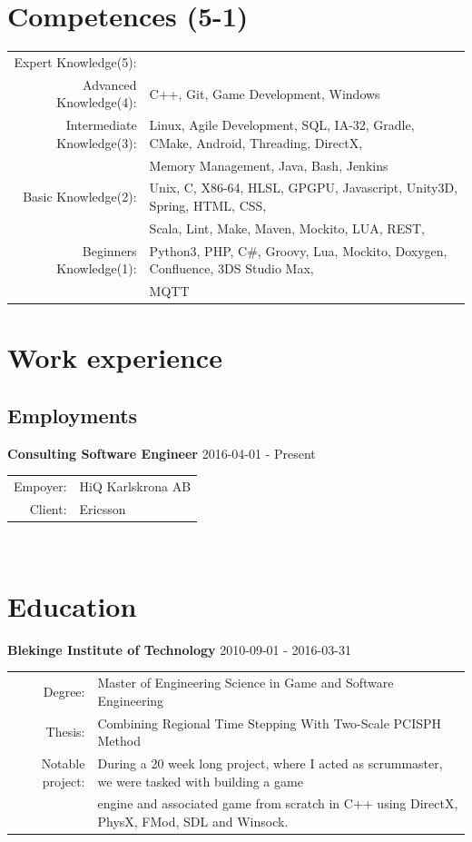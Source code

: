 \documentclass[a4paper,10pt]{article}
\begin{document}
\section{Competences (5-1)}
\begin{tabular}{rl}
Expert Knowledge(5):    & \\
Advanced Knowledge(4):& C++, Git, Game Development, Windows\\
Intermediate Knowledge(3):& Linux, Agile Development, SQL, IA-32, Gradle, CMake, Android, Threading,  DirectX, \\& Memory Management, Java, Bash, Jenkins\\
Basic Knowledge(2):& Unix, C, X86-64, HLSL, GPGPU, Javascript, Unity3D, Spring, HTML, CSS,\\& Scala, Lint, Make, Maven, Mockito, LUA, REST,  \\
Beginners Knowledge(1):& Python3, PHP, C\#, Groovy, Lua, Mockito, Doxygen, Confluence, 3DS Studio Max,\\&
MQTT \\
\end{tabular}

\section{Work experience}
\subsection{Employments}

\textbf{Consulting Software Engineer} 2016-04-01 - Present \\
\begin{tabular}{rl}
Empoyer:& HiQ Karlskrona AB\\
Client:& Ericsson  \\
\end{tabular}\\

\section{Education}
\textbf{Blekinge Institute of Technology} 2010-09-01 - 2016-03-31 \\
\begin{tabular}{rl}
Degree:&  Master of Engineering Science in Game and Software Engineering\\
Thesis:& Combining Regional Time Stepping With Two-Scale PCISPH Method\\
Notable project:& During a 20 week long project, where I acted as scrummaster, we were tasked with building a game\\& engine and associated game from scratch in C++ using DirectX, PhysX, FMod, SDL and Winsock.
\end{tabular}\\
\end{document}
